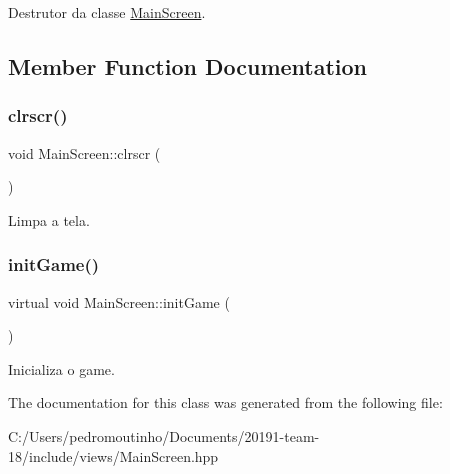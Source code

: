 Destrutor da classe \mbox{\hyperlink{class_main_screen}{Main\+Screen}}. 



\subsection{Member Function Documentation}
\mbox{\label{class_main_screen_ac3fa0644a44436d74b96c68064edbcb4}} 
\subsubsection{\texorpdfstring{clrscr()}{clrscr()}}
{\footnotesize\ttfamily void Main\+Screen\+::clrscr (\begin{DoxyParamCaption}{ }\end{DoxyParamCaption})\hspace{0.3cm}{\ttfamily [protected]}}



Limpa a tela. 

\mbox{\label{class_main_screen_a26e54b5922d5ffec7483309a14d0f55a}} 
\subsubsection{\texorpdfstring{initGame()}{initGame()}}
{\footnotesize\ttfamily virtual void Main\+Screen\+::init\+Game (\begin{DoxyParamCaption}{ }\end{DoxyParamCaption})\hspace{0.3cm}{\ttfamily [virtual]}}



Inicializa o game. 



The documentation for this class was generated from the following file\+:\begin{DoxyCompactItemize}
\item 
C\+:/\+Users/pedromoutinho/\+Documents/20191-\/team-\/18/include/views/Main\+Screen.\+hpp\end{DoxyCompactItemize}
